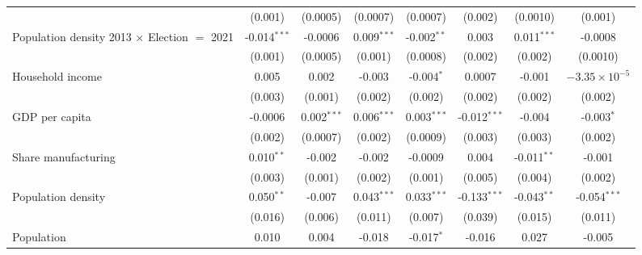 \begin{table}[htbp]
\begin{tabular}{lccccccc}
                                                              & (0.001)        & (0.0005)       & (0.0007)               & (0.0007)       & (0.002)        & (0.0010)       & (0.001)\\   
      Population density 2013 $\times$ Election $=$ 2021      & -0.014$^{***}$ & -0.0006        & 0.009$^{***}$          & -0.002$^{**}$  & 0.003          & 0.011$^{***}$  & -0.0008\\   
                                                              & (0.001)        & (0.0005)       & (0.001)                & (0.0008)       & (0.002)        & (0.002)        & (0.0010)\\   
      Household income                                        & 0.005          & 0.002          & -0.003                 & -0.004$^{*}$   & 0.0007         & -0.001         & $-3.35\times 10^{-5}$\\    
                                                              & (0.003)        & (0.001)        & (0.002)                & (0.002)        & (0.002)        & (0.002)        & (0.002)\\   
      GDP per capita                                          & -0.0006        & 0.002$^{***}$  & 0.006$^{***}$          & 0.003$^{***}$  & -0.012$^{***}$ & -0.004         & -0.003$^{*}$\\   
                                                              & (0.002)        & (0.0007)       & (0.002)                & (0.0009)       & (0.003)        & (0.003)        & (0.002)\\   
      Share manufacturing                                     & 0.010$^{**}$   & -0.002         & -0.002                 & -0.0009        & 0.004          & -0.011$^{**}$  & -0.001\\   
                                                              & (0.003)        & (0.001)        & (0.002)                & (0.001)        & (0.005)        & (0.004)        & (0.002)\\   
      Population density                                      & 0.050$^{**}$   & -0.007         & 0.043$^{***}$          & 0.033$^{***}$  & -0.133$^{***}$ & -0.043$^{**}$  & -0.054$^{***}$\\   
                                                              & (0.016)        & (0.006)        & (0.011)                & (0.007)        & (0.039)        & (0.015)        & (0.011)\\   
      Population                                              & 0.010          & 0.004          & -0.018                 & -0.017$^{*}$   & -0.016         & 0.027          & -0.005\\   

\end{tabular}
\end{table}
